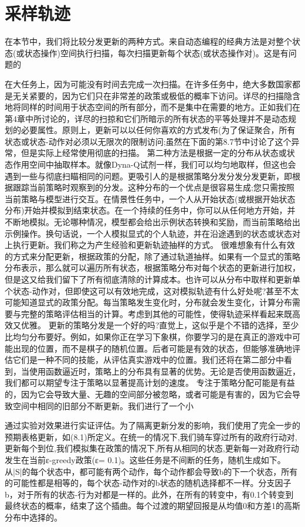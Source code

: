 \section{采样轨迹}

在本节中，我们将比较分发更新的两种方式。来自动态编程的经典方法是对整个状态(或状态操作)空间执行扫描，每次扫描更新每个状态(或状态操作对)。这是有问题的

在大任务上，因为可能没有时间去完成一次扫描。在许多任务中，绝大多数国家都是无关紧要的，因为它们只在非常差的政策或极低的概率下访问。详尽的扫描隐含地将同样的时间用于状态空间的所有部分，而不是集中在需要的地方。正如我们在第4章中所讨论的，详尽的扫掠和它们所暗示的所有状态的平等处理并不是动态规划的必要属性。原则上，更新可以以任何你喜欢的方式发布(为了保证聚合，所有状态或状态-动作对必须以无限次的限制访问;虽然在下面的第8.7节中讨论了这个异常，但是实际上经常使用彻底的扫描。
第二种方法是根据一定的分布从状态或状态作用空间中抽取样本。就像Dyna-Q试剂一样，我们可以均匀地取样，但这也会遇到一些与彻底扫瞄相同的问题。更吸引人的是根据策略分发分发分发更新，即根据跟踪当前策略时观察到的分发。这种分布的一个优点是很容易生成;您只需按照当前策略与模型进行交互。在情景性任务中，一个人从开始状态(或根据开始状态分布)开始并模拟到结束状态。在一个持续的任务中，你可以从任何地方开始，并不断地模拟。无论哪种情况，模型都会给出示例状态转换和奖励，而当前策略给出示例操作。换句话说，一个人模拟显式的个人轨迹，并在沿途遇到的状态或状态对上执行更新。我们称之为产生经验和更新轨迹抽样的方式。
很难想象有什么有效的方式来分配更新，根据政策的分配，除了通过轨道抽样。如果有一个显式的策略分布表示，那么就可以遍历所有状态，根据策略分布对每个状态的更新进行加权，但是这又给我们留下了所有彻底清除的计算成本。也许可以从分布中取样和更新单个状态-动作对，但即使这可以有效地完成，这对模拟轨迹有什么好处呢?甚至不太可能知道显式的政策分配。每当策略发生变化时，分布就会发生变化，计算分布需要与完整的策略评估相当的计算。考虑到其他的可能性，使得轨迹采样看起来既高效又优雅。
更新的策略分发是一个好的吗?直觉上，这似乎是个不错的选择，至少比均匀分布要好。例如，如果你正在学习下象棋，你要学习的是在真正的游戏中可能出现的位置，而不是棋子的随机位置。后者可能是有效的状态，但能够准确地评估它们是一种不同的技能，从评估真实游戏中的位置。我们还将在第二部分中看到，当使用函数逼近时，策略上的分布具有显著的优势。无论是否使用函数逼近，我们都可以期望专注于策略以显著提高计划的速度。
专注于策略分配可能是有益的，因为它会导致大量、无趣的空间部分被忽略，或者可能是有害的，因为它会导致空间中相同的旧部分不断更新。我们进行了一个小

通过实验对效果进行实证评估。为了隔离更新分发的影响，我们使用了完全一步的预期表格更新，如(8.1)所定义。在统一的情况下,我们骑车穿过所有的政府行动对,更新每个到位,我们模拟集在政策的情况下,所有从相同的状态,更新每一对政府行动发生在当前ε-greedy政策(ε= 0.1)。这些任务是不间断的任务，随机生成如下。从|S|的每个状态中，都可能有两个动作，每个动作都会导致b的下一个状态，所有的可能性都是相等的，每个状态-动作对的b状态的随机选择都不一样。分支因子b，对于所有的状态-行为对都是一样的。此外，在所有的转变中，有0.1个转变到最终状态的概率，结束了这个插曲。每个过渡的期望回报是从均值0和方差1的高斯分布中选择的。




